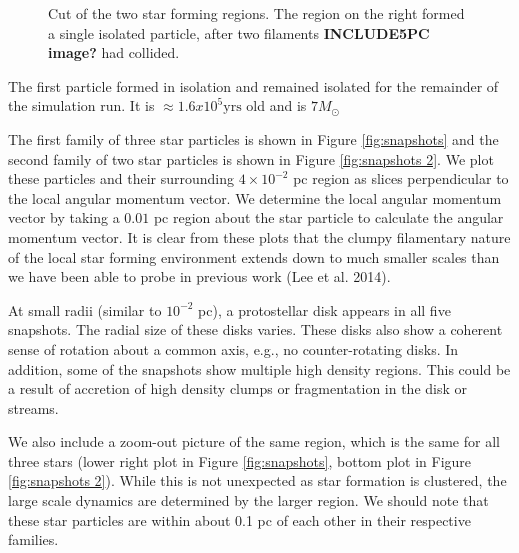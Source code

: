 \documentclass{emulateapj}
\begin{document}
\begin{figure}
\caption{Cut of the two star forming regions. The region on the right formed a single isolated particle, after two filaments {\bf INCLUDE5PC image? } had collided.\label{fig:star forming regions}}
\end{figure}


The first particle formed in isolation and remained isolated for the remainder of the simulation run. It is $\approx 1.6x10^5\text{yrs}$ old and is $7 M_{\odot}$ 







The first family of three star particles is shown in Figure \ref{fig:snapshots} and the second family of two star particles is shown in Figure \ref{fig:snapshots 2}.  We plot these particles and their surrounding $4\times 10^{-2}$ pc region as slices perpendicular to the local angular momentum vector.  We determine the local angular momentum vector by taking a $0.01$ pc region about the star particle to calculate the angular momentum vector.  It is clear from these plots that the clumpy filamentary nature of the local star forming environment extends down to much smaller scales than we have been able to probe in previous work (Lee et al. 2014).  

At small radii (similar to $10^{-2}$ pc), a protostellar disk appears in all five snapshots. The radial size of these disks varies. These disks also show a coherent sense of rotation about a common axis, e.g., no counter-rotating disks. In addition, some of the snapshots show multiple high density regions. This could be a result of accretion of high density clumps or fragmentation in the disk or streams.  

We also include a zoom-out picture of the same region, which is the same for all three stars (lower right plot in Figure \ref{fig:snapshots}, bottom plot in Figure \ref{fig:snapshots 2}).  While this is not unexpected as star formation is clustered, the large scale dynamics are determined by the larger region.  We should note that these star particles are within about 0.1 pc of each other in their respective families.  

\end{document}
